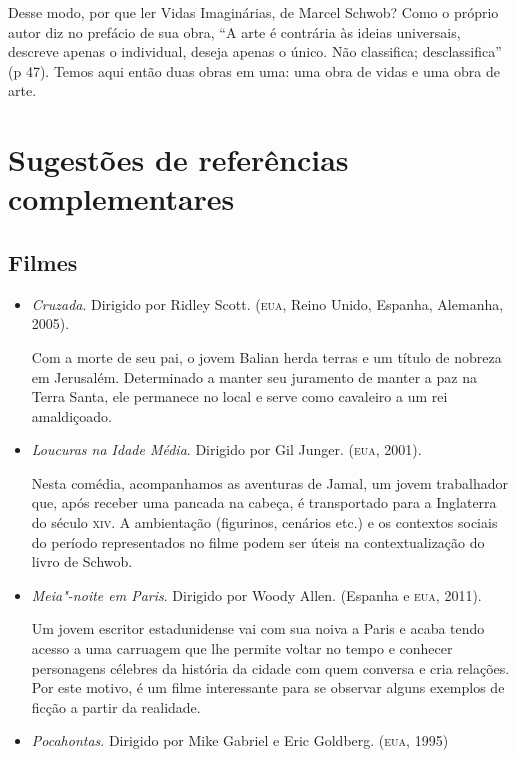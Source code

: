 \documentclass[12pt]{extarticle}
\begin{document}
Desse modo, por que ler Vidas Imaginárias, de Marcel Schwob? Como o
próprio autor diz no prefácio de sua obra, ``A arte é contrária às
ideias universais, descreve apenas o individual, deseja apenas o único.
Não classifica; desclassifica'' (p 47). Temos aqui então duas obras em
uma: uma obra de vidas e uma obra de arte.


\section{Sugestões de referências complementares}\label{sugestoes}
\subsection{Filmes}
\begin{itemize}

	\item\textit{Cruzada}. Dirigido por Ridley Scott. (\textsc{eua}, Reino Unido, Espanha,
	Alemanha, 2005).

	Com a morte de seu pai, o jovem Balian herda terras e um título de
	nobreza em Jerusalém. Determinado a manter seu juramento de manter a paz
	na Terra Santa, ele permanece no local e serve como cavaleiro a um rei
	amaldiçoado.

	\item\textit{Loucuras na Idade Média}. Dirigido por Gil Junger. (\textsc{eua}, 2001).

	Nesta comédia, acompanhamos as aventuras de Jamal, um jovem trabalhador que, após receber
	uma pancada na cabeça, é transportado para a Inglaterra do século \textsc{xiv}.
	A ambientação (figurinos, cenários etc.) e os contextos sociais do período representados no filme
	podem ser úteis na contextualização do livro de Schwob.


	\item\textit{Meia"-noite em Paris}. Dirigido por Woody Allen. (Espanha e \textsc{eua}, 2011).

	Um jovem escritor estadunidense vai com sua noiva a Paris e acaba tendo acesso
	a uma carruagem que lhe permite voltar no tempo e conhecer personagens célebres da 
	história da cidade com quem conversa e cria relações. Por este motivo, é um filme 
	interessante para se observar alguns exemplos de ficção a partir da realidade.

	\item\textit{Pocahontas}. Dirigido por Mike Gabriel e Eric Goldberg. (\textsc{eua}, 1995)


\end{itemize}
\end{document}
